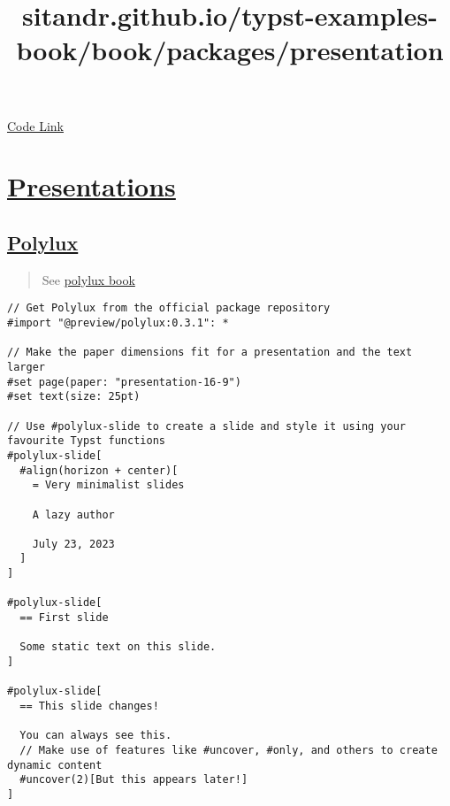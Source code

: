 \href{https://gist.github.com/taylorh140/9e353fdf737f1ef51aacb332efdd9516}{Code
Link}



\title{sitandr.github.io/typst-examples-book/book/packages/presentation}

\section{\texorpdfstring{\hyperref[presentations]{Presentations}}{Presentations}}\label{presentations}

\subsection{\texorpdfstring{\hyperref[polylux]{Polylux}}{Polylux}}\label{polylux}

\begin{quote}
See \href{https://polylux.dev/book/}{polylux book}
\end{quote}

\begin{verbatim}
// Get Polylux from the official package repository
#import "@preview/polylux:0.3.1": *

// Make the paper dimensions fit for a presentation and the text larger
#set page(paper: "presentation-16-9")
#set text(size: 25pt)

// Use #polylux-slide to create a slide and style it using your favourite Typst functions
#polylux-slide[
  #align(horizon + center)[
    = Very minimalist slides

    A lazy author

    July 23, 2023
  ]
]

#polylux-slide[
  == First slide

  Some static text on this slide.
]

#polylux-slide[
  == This slide changes!

  You can always see this.
  // Make use of features like #uncover, #only, and others to create dynamic content
  #uncover(2)[But this appears later!]
]
\end{verbatim}

\pandocbounded{}

\pandocbounded{}

